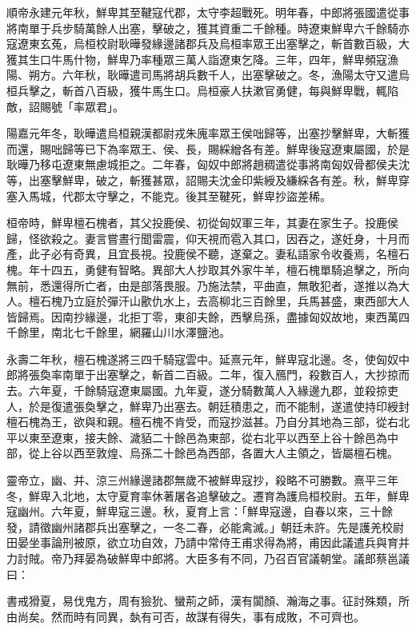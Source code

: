 \begin{pinyinscope}
順帝永建元年秋，鮮卑其至鞬寇代郡，太守李超戰死。明年春，中郎將張國遣從事將南單于兵步騎萬餘人出塞，擊破之，獲其資重二千餘種。時遼東鮮卑六千餘騎亦寇遼東玄菟，烏桓校尉耿曄發緣邊諸郡兵及烏桓率眾王出塞擊之，斬首數百級，大獲其生口牛馬什物，鮮卑乃率種眾三萬人詣遼東乞降。三年，四年，鮮卑頻寇漁陽、朔方。六年秋，耿曄遣司馬將胡兵數千人，出塞擊破之。冬，漁陽太守又遣烏桓兵擊之，斬首八百級，獲牛馬生口。烏桓豪人扶漱官勇健，每與鮮卑戰，輒陷敵，詔賜號「率眾君」。

陽嘉元年冬，耿曄遣烏桓親漢都尉戎朱廆率眾王侯咄歸等，出塞抄擊鮮卑，大斬獲而還，賜咄歸等已下為率眾王、侯、長，賜綵繒各有差。鮮卑後寇遼東屬國，於是耿曄乃移屯遼東無慮城拒之。二年春，匈奴中郎將趙稠遣從事將南匈奴骨都侯夫沈等，出塞擊鮮卑，破之，斬獲甚眾，詔賜夫沈金印紫綬及縑綵各有差。秋，鮮卑穿塞入馬城，代郡太守擊之，不能克。後其至鞬死，鮮卑抄盜差稀。

桓帝時，鮮卑檀石槐者，其父投鹿侯、初從匈奴軍三年，其妻在家生子。投鹿侯歸，怪欲殺之。妻言嘗晝行聞雷震，仰天視而雹入其口，因吞之，遂妊身，十月而產，此子必有奇異，且宜長視。投鹿侯不聽，遂棄之。妻私語家令收養焉，名檀石槐。年十四五，勇健有智略。異部大人抄取其外家牛羊，檀石槐單騎追擊之，所向無前，悉還得所亡者，由是部落畏服。乃施法禁，平曲直，無敢犯者，遂推以為大人。檀石槐乃立庭於彈汗山歠仇水上，去高柳北三百餘里，兵馬甚盛，東西部大人皆歸焉。因南抄緣邊，北拒丁零，東卻夫餘，西擊烏孫，盡據匈奴故地，東西萬四千餘里，南北七千餘里，網羅山川水澤鹽池。

永壽二年秋，檀石槐遂將三四千騎寇雲中。延熹元年，鮮卑寇北邊。冬，使匈奴中郎將張奐率南單于出塞擊之，斬首二百級。二年，復入鴈門，殺數百人，大抄掠而去。六年夏，千餘騎寇遼東屬國。九年夏，遂分騎數萬人入緣邊九郡，並殺掠吏人，於是復遣張奐擊之，鮮卑乃出塞去。朝廷積患之，而不能制，遂遣使持印綬封檀石槐為王，欲與和親。檀石槐不肯受，而寇抄滋甚。乃自分其地為三部，從右北平以東至遼東，接夫餘、濊貊二十餘邑為東部，從右北平以西至上谷十餘邑為中部，從上谷以西至敦煌、烏孫二十餘邑為西部，各置大人主領之，皆屬檀石槐。

靈帝立，幽、并、涼三州緣邊諸郡無歲不被鮮卑寇抄，殺略不可勝數。熹平三年冬，鮮卑入北地，太守夏育率休著屠各追擊破之。遷育為護烏桓校尉。五年，鮮卑寇幽州。六年夏，鮮卑寇三邊。秋，夏育上言：「鮮卑寇邊，自春以來，三十餘發，請徵幽州諸郡兵出塞擊之，一冬二春，必能禽滅。」朝廷未許。先是護羌校尉田晏坐事論刑被原，欲立功自效，乃請中常侍王甫求得為將，甫因此議遣兵與育并力討賊。帝乃拜晏為破鮮卑中郎將。大臣多有不同，乃召百官議朝堂。議郎蔡邕議曰：

書戒猾夏，易伐鬼方，周有獫狁、蠻荊之師，漢有闐顏、瀚海之事。征討殊類，所由尚矣。然而時有同異，埶有可否，故謀有得失，事有成敗，不可齊也。


\end{pinyinscope}
